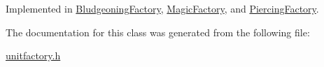 \-Implemented in \hyperlink{class_bludgeoning_factory_adb269785fcab1a468aabe771cf4f4336}{\-Bludgeoning\-Factory}, \hyperlink{class_magic_factory_a3021b979bd991e32e311c8869d500b46}{\-Magic\-Factory}, and \hyperlink{class_piercing_factory_a3a2f3736e85a5c4b0ad0160b1b34d796}{\-Piercing\-Factory}.



\-The documentation for this class was generated from the following file\-:\begin{DoxyCompactItemize}
\item 
\hyperlink{unitfactory_8h}{unitfactory.\-h}\end{DoxyCompactItemize}
